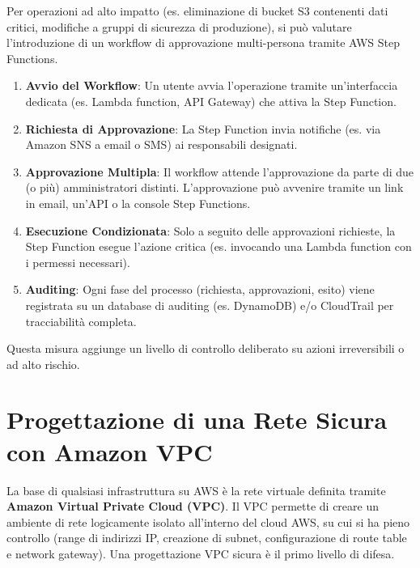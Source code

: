 Per operazioni ad alto impatto (es. eliminazione di bucket S3 contenenti dati critici, modifiche a gruppi di sicurezza di produzione), si può valutare l'introduzione di un workflow di approvazione multi-persona tramite AWS Step Functions.
\begin{enumerate}
    \item \textbf{Avvio del Workflow}: Un utente avvia l'operazione tramite un'interfaccia dedicata (es. Lambda function, API Gateway) che attiva la Step Function.
    \item \textbf{Richiesta di Approvazione}: La Step Function invia notifiche (es. via Amazon SNS a email o SMS) ai responsabili designati.
    \item \textbf{Approvazione Multipla}: Il workflow attende l'approvazione da parte di due (o più) amministratori distinti. L'approvazione può avvenire tramite un link in email, un'API o la console Step Functions.
    \item \textbf{Esecuzione Condizionata}: Solo a seguito delle approvazioni richieste, la Step Function esegue l'azione critica (es. invocando una Lambda function con i permessi necessari).
    \item \textbf{Auditing}: Ogni fase del processo (richiesta, approvazioni, esito) viene registrata su un database di auditing (es. DynamoDB) e/o CloudTrail per tracciabilità completa.
\end{enumerate}
Questa misura aggiunge un livello di controllo deliberato su azioni irreversibili o ad alto rischio.


\section{Progettazione di una Rete Sicura con Amazon VPC}
\label{sec:vpc-design}

La base di qualsiasi infrastruttura su AWS è la rete virtuale definita tramite \textbf{Amazon Virtual Private Cloud (VPC)}. Il VPC permette di creare un ambiente di rete logicamente isolato all'interno del cloud AWS, su cui si ha pieno controllo (range di indirizzi IP, creazione di subnet, configurazione di route table e network gateway). Una progettazione VPC sicura è il primo livello di difesa.


